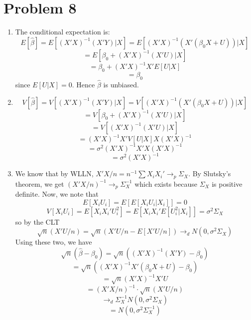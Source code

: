 \documentclass[10pt,letter]{article}
\begin{document}
\section*{Problem 8}
\begin{enumerate}[label=(\alph*)]
\item The conditional expectation is:
\[ E[\hat{\beta}] = E[(X'X)^{-1}(X'Y) | X] = E[(X'X)^{-1}(X'(\beta_0 X + U)) | X] \]
\[ = E[\beta_0 + (X'X)^{-1}(X'U) | X] \]
\[ = \beta_0 + (X'X)^{-1}X'E[U|X] \]
\[ = \beta_0 \]
since $E[U|X] = 0$. Hence $\hat{\beta}$ is unbiased.
\item
\[ V[\hat{\beta}] = V[(X'X)^{-1}(X'Y) | X] = V[(X'X)^{-1}(X'(\beta_0 X + U)) | X] \]
\[ = V[\beta_0 + (X'X)^{-1}(X'U) | X] \]
\[ = V[ (X'X)^{-1}(X'U) | X] \]
\[ = (X'X)^{-1}X' V[U|X] X (X'X)^{-1} \]
\[ = \sigma^2 (X'X)^{-1}X' X (X'X)^{-1} \]
\[ = \sigma^2 (X'X)^{-1} \]
\item We know that by WLLN, $X'X/n = n^{-1} \sum X_iX_i' \to_p \Sigma_X$. By Slutsky's theorem, we get $(X'X/n )^{-1} \to_p \Sigma_X^{-1} $ which exists because $\Sigma_X$ is positive definite. Now, we note that
\[ E[X_i U_i] = E[E[X_i U_i|X_i]] = 0 \]
\[ V[X_iU_i] = E[X_i X_i' U_i^2] = E[X_i X_i' E[U_i^2 | X_i]]  = \sigma^2 \Sigma_X \]
so by the CLT
\[ \sqrt{n}(X'U/n) = \sqrt{n}(X'U/n - E[X'U/n]) \to_d N(0, \sigma^2\Sigma_X) \]
Using these two, we have
\[ \sqrt{n} (\hat{\beta} - \beta_0) = \sqrt{n} ((X'X)^{-1}(X'Y) - \beta_0) \]
\[ = \sqrt{n}((X'X)^{-1}X'(\beta_0X + U) - \beta_0) \]
\[ = \sqrt{n}(X'X)^{-1}X'U \]
\[ = (X'X/n)^{-1} \cdot \sqrt{n}(X'U/n) \]
\[ \to_d \Sigma_X^{-1} N(0, \sigma^2\Sigma_X)\]
\[ =  N(0, \sigma^2\Sigma_X^{-1})\]


\end{enumerate}
\end{document}
